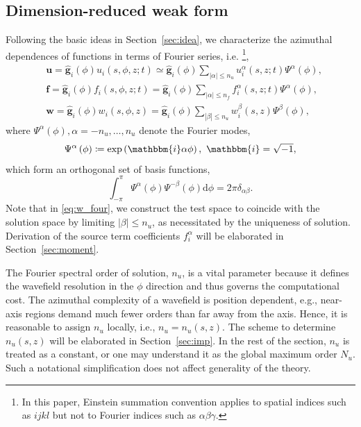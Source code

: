 \documentclass[extra]{gji}
\begin{document}
\subsection{Dimension-reduced weak form}
Following the basic ideas in Section~\ref{sec:idea}, we characterize 
the azimuthal dependences of functions in terms of Fourier series,
i.e.%
\footnote{In this paper, Einstein summation convention applies to 
spatial indices such as $ijkl$ but not to Fourier indices such as
$\alpha\beta\gamma$.},
\begin{align}
  & \mathbf{u}=\hat{\mathbf{g}}_{i}\left(\phi\right) u_i\!\left(s,\phi,z;t\right) 
  \simeq \hat{\mathbf{g}}_{i}\left(\phi\right) \!\sum_{|\alpha|\le n_u} \!
  u_i^\alpha\!\left(s,z;t\right)\Psi^\alpha\left(\phi\right),
  \label{eq:u_four}\\[.5em]
  & \mathbf{f}=\hat{\mathbf{g}}_{i}\left(\phi\right) f_i\left(s,\phi,z;t\right) 
  = \hat{\mathbf{g}}_{i}\left(\phi\right) \!\sum_{|\alpha|\le n_f}\! 
  f_i^\alpha\left(s,z;t\right)\Psi^\alpha\left(\phi\right),
  \label{eq:f_four}\\[.5em]
  & \mathbf{w}=\hat{\mathbf{g}}_{i}\left(\phi\right) w_i\left(s,\phi,z\right) 
  = \hat{\mathbf{g}}_{i}\left(\phi\right) \sum_{|\beta|\le n_u} 
  w_i^\beta\left(s,z\right)\Psi^\beta\left(\phi\right),
  \label{eq:w_four}
\end{align}
where $\Psi^\alpha\left(\phi\right), \alpha=-n_u,\dots,n_u$ denote the Fourier modes, 
\begin{equation}
  \Psi^\alpha\left(\phi\right)\coloneqq\exp\left(\mathbbm{i}\alpha\phi\right),\ \mathbbm{i}=\sqrt{-1},
\end{equation}
which form an orthogonal set of basis functions,
\begin{equation}
  \int_{-\pi}^{\pi}\Psi^\alpha\left(\phi\right)\Psi^{-\beta}\left(\phi\right)\text{d}\phi=
  2\pi\delta_{\alpha\beta}.
  \label{eq:orth}
\end{equation}
Note that in \eqref{eq:w_four}, we construct the test space to coincide 
with the solution space by limiting $|\beta|\le n_u$, as necessitated by
the uniqueness of solution. Derivation of the source term
coefficients $f_i^\alpha$ will be elaborated in Section~\ref{sec:moment}.

The Fourier spectral order of solution, $n_u$, is a vital parameter 
because it defines the wavefield resolution in the $\phi$
direction and thus governs the computational cost. 
The azimuthal complexity of a wavefield is position dependent, 
e.g., near-axis regions demand much fewer orders than
far away from the axis. Hence, it is reasonable to assign 
$n_u$ locally, i.e., $n_u=n_u\left(s,z\right)$. The scheme to determine 
$n_u\left(s,z\right)$ will be elaborated in Section~\ref{sec:imp}. In the 
rest of the section, $n_u$ is treated as a constant, or one may
understand it as the global maximum order $N_u$. 
Such a notational simplification
does not affect generality of the theory. 
\end{document}
